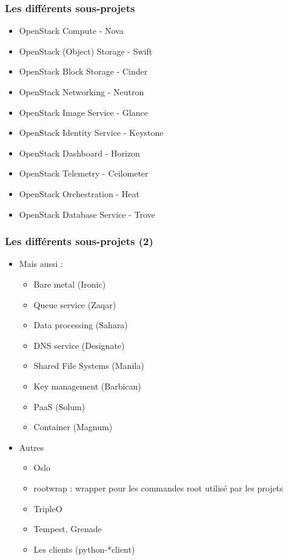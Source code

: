  \begin{frame}
    \frametitle{Les différents sous-projets}
    \begin{itemize}
        \item OpenStack Compute - Nova
        \item OpenStack (Object) Storage - Swift\pause
        \item OpenStack Block Storage - Cinder\pause
        \item OpenStack Networking - Neutron\pause
        \item OpenStack Image Service - Glance\pause
        \item OpenStack Identity Service - Keystone\pause
        \item OpenStack Dashboard - Horizon\pause
        \item OpenStack Telemetry - Ceilometer\pause
        \item OpenStack Orchestration - Heat\pause
        \item OpenStack Database Service - Trove
    \end{itemize}
  \end{frame}

  \begin{frame}
    \frametitle{Les différents sous-projets (2)}
    \begin{itemize}
      \item Mais aussi :
      \begin{itemize}
        \item Bare metal (Ironic)
        \item Queue service (Zaqar)
        \item Data processing (Sahara)
        \item DNS service (Designate)
        \item Shared File Systems (Manila)
        \item Key management (Barbican)
        \item PaaS (Solum)\pause
        \item Container (Magnum)
      \end{itemize}\pause
      \item Autres
      \begin{itemize}
        \item Oslo
        \item rootwrap : wrapper pour les commandes root utilisé par les projets
        \item TripleO
        \item Tempest, Grenade
        \item Les clients (python-*client)
      \end{itemize}
    \end{itemize}
  \end{frame}

